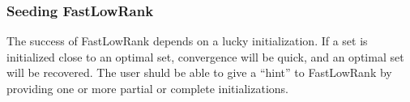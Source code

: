 \documentclass{article}
\begin{document}
\subsubsection{Seeding FastLowRank}
The success of FastLowRank depends on a lucky initialization. If a set is initialized close to an optimal set, convergence will be quick, and an optimal set will be recovered. The user shuld be able to give a ``hint'' to FastLowRank by providing one or more partial or complete initializations.
\end{document}
